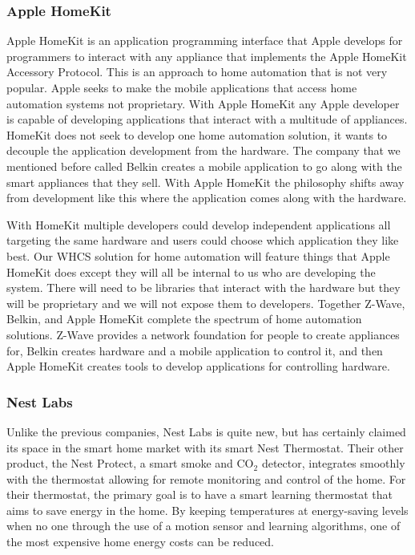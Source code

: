 \subsubsection{Apple HomeKit}

Apple HomeKit is an application programming interface that Apple develops for
programmers to interact with any appliance that implements the Apple HomeKit
Accessory Protocol. This is an approach to home automation that is not very
popular.  Apple seeks to make the mobile applications that access home
automation systems not proprietary. With Apple HomeKit any Apple developer is
capable of developing applications that interact with a multitude of
appliances. HomeKit does not seek to develop one home automation solution, it
wants to decouple the application development from the hardware. The company
that we mentioned before called Belkin creates a mobile application to go along
with the smart appliances that they sell. With Apple HomeKit the philosophy
shifts away from development like this where the application comes along with
the hardware.

With HomeKit multiple developers could develop independent applications all
targeting the same hardware and users could choose which application they like
best. Our WHCS solution for home automation will feature things that Apple
HomeKit does except they will all be internal to us who are developing the
system. There will need to be libraries that interact with the hardware but
they will be proprietary and we will not expose them to developers. Together
Z{}-Wave, Belkin, and Apple HomeKit complete the spectrum of home automation
solutions. Z{}-Wave provides a network foundation for people to create
appliances for, Belkin creates hardware and a mobile application to control it,
and then Apple HomeKit creates tools to develop applications for controlling
hardware.


\subsubsection{Nest Labs}
Unlike the previous companies, Nest Labs\cite{link19} is quite new,
but has certainly claimed its space in the smart home market with its smart
Nest Thermostat. Their other product, the Nest Protect, a smart smoke and
CO$_2$ detector, integrates smoothly with the thermostat allowing for remote
monitoring and control of the home. For their thermostat, the primary goal is
to have a smart learning thermostat that aims to save energy in the home. By
keeping temperatures at energy-saving levels when no one through the use of a
motion sensor and learning algorithms, one of the most expensive home energy
costs can be reduced.


